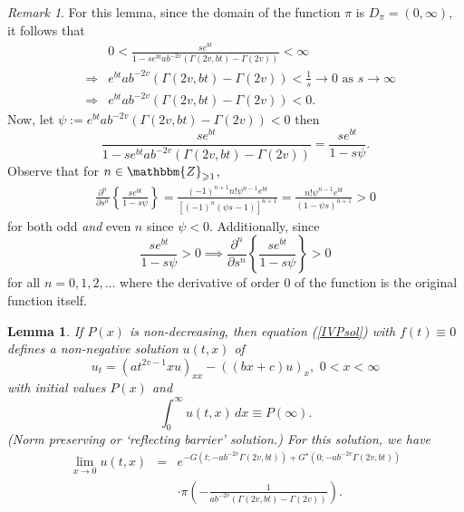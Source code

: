 \documentclass[preprint, 12pt]{elsarticle}
\numberwithin{equation}{section}
\theoremstyle{plain}
\newtheorem{lemma}{Lemma}[section]
\theoremstyle{remark}
\newtheorem{remark}{Remark}[section]
\newcommand{\assign}{:=}
\newcommand{\nocomma}{}
\begin{document}
\begin{remark}\label{proofsupp}
For this lemma, since the domain of the function $\pi$ is $D_{\pi} = (0, \infty)$, it follows that
\begin{eqnarray*}
& & 0 < \frac{s e^{bt}}{1 - s e^{bt} a b^{- 2 v}  (\Gamma (2 v \nocomma, b t) - \Gamma (2 v \nocomma))} < \infty \\ 
& \Longrightarrow & e^{bt} a b^{- 2 v}  (\Gamma (2 v \nocomma, b t) - \Gamma (2 v \nocomma)) < \frac{1}{s} \rightarrow 0 \text{ as } s \rightarrow \infty\\
& \Longrightarrow & e^{bt} a b^{- 2 v}  (\Gamma (2 v \nocomma, b t) - \Gamma (2 v \nocomma)) < 0.
\end{eqnarray*}
Now, let $\displaystyle{\psi \assign e^{bt} a b^{- 2 v}  (\Gamma (2 v \nocomma, b t) - \Gamma (2 v \nocomma)) < 0}$ then \[\displaystyle{\frac{s e^{bt}}{1 - s e^{bt} a b^{- 2 v}  (\Gamma (2 v \nocomma, b t) - \Gamma (2 v \nocomma))} = \frac{s e^{bt}}{1 - s \psi}}.\] Observe that for $n \in \mathbbm{Z}_{\geqslant 1}$,
\begin{eqnarray*}
\frac{\partial^n}{\partial s^n} \left\{ \frac{s e^{bt}}{1 - s \psi} \right\} = \frac{(- 1)^{n + 1} n! \psi^{n - 1} e^{bt}}{[(- 1)^n  (\psi s - 1)]^{n + 1}} = \frac{n! \psi^{n - 1} e^{bt}}{(1 - \psi s)^{n + 1}}>0
\end{eqnarray*}
for both odd \emph{and} even $n$ since $\psi < 0$. Additionally, since
\[ \frac{s e^{bt}}{1 - s \psi} > 0 \implies \frac{\partial^n}{\partial s^n} \left\{ \frac{s e^{bt}}{1 - s \psi} \right\} > 0
\]
for all $n = 0, 1, 2, \ldots$ where the derivative of order $0$ of the function is the original function itself.
\end{remark}

\begin{lemma}
If $P (x)$ is non-decreasing, then equation (\ref{IVPsol}) with $f (t) \equiv 0$ defines a non-negative solution $u (t, x)$ of
\[ u_t = (a t^{2 v - 1} x u)_{x x} - ((b x + c) u)_x, \,\, 0 < x < \infty \]
with initial values $P (x)$ and
\begin{equation}
\int_0^{\infty} u (t, x)\,dx \equiv P (\infty) \label{equivP}.
\end{equation}
(Norm preserving or `reflecting barrier' solution.) For this solution, we have
\begin{eqnarray}
\lim_{x \rightarrow 0} u (t, x) & = & e^{- G (t ; - a b^{- 2 v} \Gamma (2 v \nocomma, b t)) + G^{\star} \left(0 ; - a b^{- 2 v} \Gamma (2 v \nocomma, bt)\right)}\label{slimx0} \\
& & \cdot \pi \left( - \frac{1}{a b^{- 2 v} \left( \Gamma (2 v \nocomma, b t) - \Gamma(2v)\right)} \right).\nonumber
\end{eqnarray}
\end{lemma}
\end{document}
